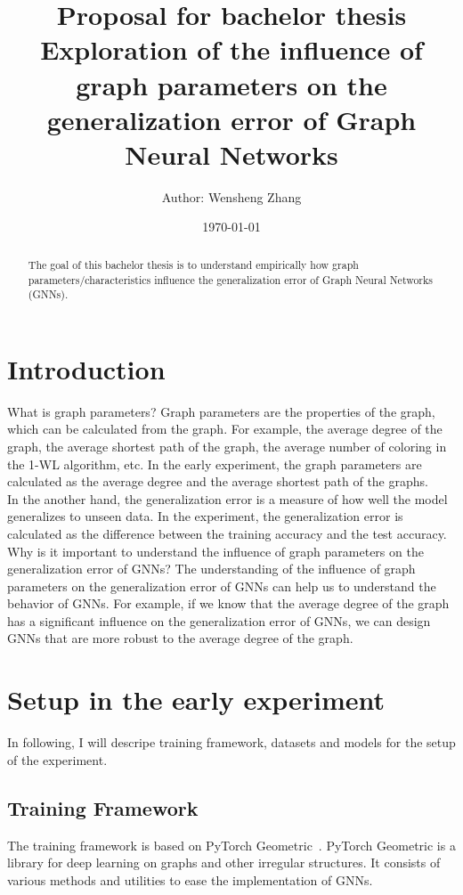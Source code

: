 \documentclass{article}
\title{\textbf{Proposal for bachelor thesis}\\
Exploration of the influence of graph parameters on the generalization error of Graph Neural Networks}
\author{Author: Wensheng Zhang}
\date{\today}
\begin{document}
 

\maketitle

\tableofcontents


\begin{abstract}
The goal of this bachelor thesis is to understand empirically how graph parameters/characteristics influence the generalization error of Graph Neural Networks (GNNs).
\end{abstract}


\section{Introduction}

What is graph parameters? Graph parameters are the properties of the graph, which can be calculated from the graph. For example, the average degree of the graph, the average shortest path of the graph, the average number of coloring in the 1-WL algorithm, etc. In the early experiment, the graph parameters are calculated as the average degree and the average shortest path of the graphs.
\\
In the another hand, the generalization error is a measure of how well the model generalizes to unseen data. In the experiment, the generalization error is calculated as the difference between the training accuracy and the test accuracy.
\\
Why is it important to understand the influence of graph parameters on the generalization error of GNNs? The understanding of the influence of graph parameters on the generalization error of GNNs can help us to understand the behavior of GNNs. For example, if we know that the average degree of the graph has a significant influence on the generalization error of GNNs, we can design GNNs that are more robust to the average degree of the graph.



\section{Setup in the early experiment}
In following, I will descripe training framework, datasets and models for the setup of the experiment.

\subsection{Training Framework}
The training framework is based on PyTorch Geometric~\cite{fey2019fast}. PyTorch Geometric is a library for deep learning on graphs and other irregular structures. It consists of various methods and utilities to ease the implementation of GNNs.
\end{document}
